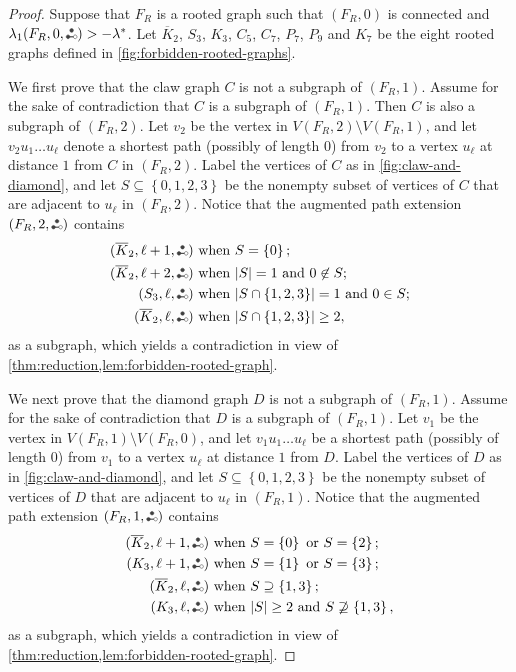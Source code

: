 \documentclass[11pt]{article}
\theoremstyle{definition}
\theoremstyle{remark}
\DeclarePairedDelimiter\abs{\lvert}{\rvert}
\newcommand{\sset}[1]{\left\{{#1}\right\}}
\newcommand{\la}{\lambda}
\newcommand{\las}{\lambda^*}
\newcommand{\etwo}{\tikz[baseline=-0.2ex, scale=0.9]{\draw[darkgray, thick] (0,0)--(0.2,0); \draw[darkgray, fill=darkgray] (0,0) circle (0.05); \draw[darkgray, fill=darkgray] (0.1,0.17320508075) circle (0.05); \draw[darkgray, fill=white] (0.2,0) circle (0.05);}}
\newcommand{\ape}[1]{(#1,\etwo)}
\begin{document}
\begin{proof}
    Suppose that $F_R$ is a rooted graph such that $(F_R, 0)$ is connected and $\la_1\ape{F_R, 0} > -\las$. Let $\overline{K}_2$, $S_3$, $K_3$, $C_5$, $C_7$, $P_7$, $P_9$ and $K_7$ be the eight rooted graphs defined in \cref{fig:forbidden-rooted-graphs}.

    We first prove that the claw graph $C$ is not a subgraph of $(F_R, 1)$. Assume for the sake of contradiction that $C$ is a subgraph of $(F_R, 1)$. Then $C$ is also a subgraph of $(F_R, 2)$. Let $v_2$ be the vertex in $V(F_R, 2) \setminus V(F_R, 1)$, and let $v_2 u_1\dots u_\ell$ denote a shortest path (possibly of length $0$) from $v_2$ to a vertex $u_\ell$ at distance $1$ from $C$ in $(F_R, 2)$. Label the vertices of $C$ as in \cref{fig:claw-and-diamond}, and let $S \subseteq \sset{0,1,2,3}$ be the nonempty subset of vertices of $C$ that are adjacent to $u_\ell$ in $(F_R, 2)$. Notice that the augmented path extension $\ape{F_R, 2}$ contains
    \begin{align*}
        \ape{\overline{K}_2,\ell+1} & \text{ when } S = \sset{0};\\
        \ape{\overline{K}_2,\ell+2} & \text{ when } \abs{S} = 1 \text{ and } 0 \not\in S;\\
        \ape{S_3,\ell} & \text{ when } \abs{S \cap \sset{1,2,3}}=1 \text{ and } 0 \in S; \\
        \ape{\overline{K}_2,\ell} & \text{ when } \abs{S \cap \sset{1,2,3}} \ge 2,
    \end{align*}
    as a subgraph, which yields a contradiction in view of \cref{thm:reduction,lem:forbidden-rooted-graph}.

    We next prove that the diamond graph $D$ is not a subgraph of $(F_R, 1)$. Assume for the sake of contradiction that $D$ is a subgraph of $(F_R, 1)$. Let $v_1$ be the vertex in $V(F_R, 1) \setminus V(F_R, 0)$, and let $v_1u_1\dots u_\ell$ be a shortest path (possibly of length $0$) from $v_1$ to a vertex $u_\ell$ at distance $1$ from $D$. Label the vertices of $D$ as in \cref{fig:claw-and-diamond}, and let $S\subseteq \sset{0,1,2,3}$ be the nonempty subset of vertices of $D$ that are adjacent to $u_\ell$ in $(F_R, 1)$. Notice that the augmented path extension $\ape{F_R, 1}$ contains
    \begin{align*}
        \ape{\overline{K}_2,\ell+1} & \text{ when } S = \sset{0} \text{ or }S = \sset{2}; \\
        \ape{K_3, \ell+1} & \text{ when } S = \sset{1} \text{ or }S = \sset{3}; \\
        \ape{\overline{K}_2,\ell} & \text{ when } S \supseteq \sset{1,3}; \\
        \ape{K_3, \ell} & \text{ when } \abs{S} \ge 2 \text{ and } S \not\supseteq \sset{1,3},
    \end{align*}
    as a subgraph, which yields a contradiction in view of \cref{thm:reduction,lem:forbidden-rooted-graph}.


\end{proof}
\end{document}
